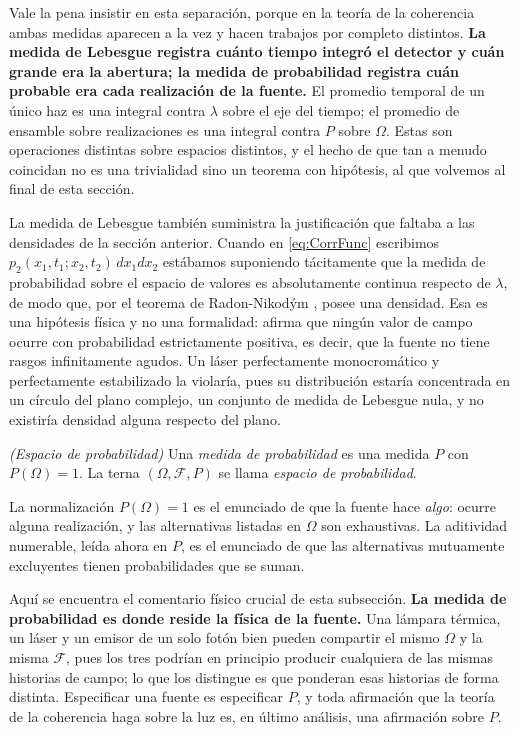 		Vale la pena insistir en esta separación, porque en la teoría de la coherencia ambas medidas aparecen a la vez y hacen trabajos por completo distintos. \textbf{La medida de Lebesgue registra cuánto tiempo integró el detector y cuán grande era la abertura; la medida de probabilidad registra cuán probable era cada realización de la fuente.} El promedio temporal de un único haz es una integral contra $\lambda$ sobre el eje del tiempo; el promedio de ensamble sobre realizaciones es una integral contra $P$ sobre $\Omega$. Estas son operaciones distintas sobre espacios distintos, y el hecho de que tan a menudo coincidan no es una trivialidad sino un teorema con hipótesis, al que volvemos al final de esta sección.

		La medida de Lebesgue también suministra la justificación que faltaba a las densidades de la sección anterior. Cuando en \eqref{eq:CorrFunc} escribimos $p_{2}(x_{1},t_{1};x_{2},t_{2})\,dx_{1}dx_{2}$ estábamos suponiendo tácitamente que la medida de probabilidad sobre el espacio de valores es absolutamente continua respecto de $\lambda$, de modo que, por el teorema de Radon-Nikodým \citep{nikodym1930generalisation}, posee una densidad. Esa es una hipótesis física y no una formalidad: afirma que ningún valor de campo ocurre con probabilidad estrictamente positiva, es decir, que la fuente no tiene rasgos infinitamente agudos. Un láser perfectamente monocromático y perfectamente estabilizado la violaría, pues su distribución estaría concentrada en un círculo del plano complejo, un conjunto de medida de Lebesgue nula, y no existiría densidad alguna respecto del plano.

		\begin{myDef}
			\textit{(Espacio de probabilidad)} Una \textit{medida de probabilidad} es una medida $P$ con $P(\Omega)=1$. La terna $(\Omega,\mathcal{F},P)$ se llama \textit{espacio de probabilidad}.
		\end{myDef}

		La normalización $P(\Omega)=1$ es el enunciado de que la fuente hace \textit{algo}: ocurre alguna realización, y las alternativas listadas en $\Omega$ son exhaustivas. La aditividad numerable, leída ahora en $P$, es el enunciado de que las alternativas mutuamente excluyentes tienen probabilidades que se suman.

		Aquí se encuentra el comentario físico crucial de esta subsección. \textbf{La medida de probabilidad es donde reside la física de la fuente.} Una lámpara térmica, un láser y un emisor de un solo fotón bien pueden compartir el mismo $\Omega$ y la misma $\mathcal{F}$, pues los tres podrían en principio producir cualquiera de las mismas historias de campo; lo que los distingue es que ponderan esas historias de forma distinta. Especificar una fuente es especificar $P$, y toda afirmación que la teoría de la coherencia haga sobre la luz es, en último análisis, una afirmación sobre $P$.

